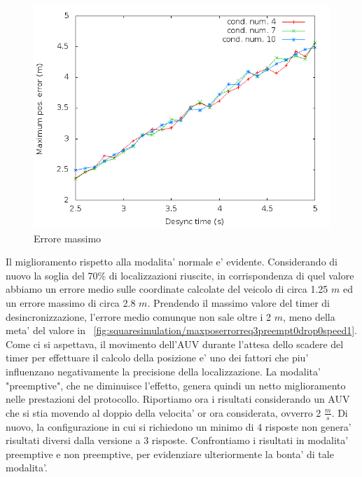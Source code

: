 \begin{figure}
    \centering
    \includegraphics[scale=0.5]{squaresimulation/maxposerrorreq3preempt1drop0speed1.png}
    \caption{Errore massimo}
    \label{fig:squaresimulation/maxposerrorreq3preempt1drop0speed1}
\end{figure}

Il miglioramento rispetto alla modalita' normale e' evidente. Considerando di nuovo la soglia del 70\% di localizzazioni riuscite, in corrispondenza di quel valore abbiamo un errore medio sulle coordinate calcolate del veicolo di circa 1.25 $m$ ed un errore massimo di circa 2.8 $m$. Prendendo il massimo valore del timer di desincronizzazione, l'errore medio comunque non sale oltre i 2 $m$, meno della meta' del valore in ~\ref{fig:squaresimulation/maxposerrorreq3preempt0drop0speed1}.
Come ci si aspettava, il movimento dell'AUV durante l'attesa dello scadere del timer per effettuare il calcolo della posizione e' uno dei fattori che piu' influenzano negativamente la precisione della localizzazione. La modalita' "preemptive", che ne diminuisce l'effetto, genera quindi un netto miglioramento nelle prestazioni del protocollo.
Riportiamo ora i risultati considerando un AUV che si stia movendo al doppio della velocita' or ora considerata, ovverro 2 $\frac{m}{s}$.
Di nuovo, la configurazione in cui si richiedono un minimo di 4 risposte non genera' risultati diversi dalla versione a 3 risposte.
Confrontiamo i risultati in modalita' preemptive e non preemptive, per evidenziare ulteriormente la bonta' di tale modalita'.

